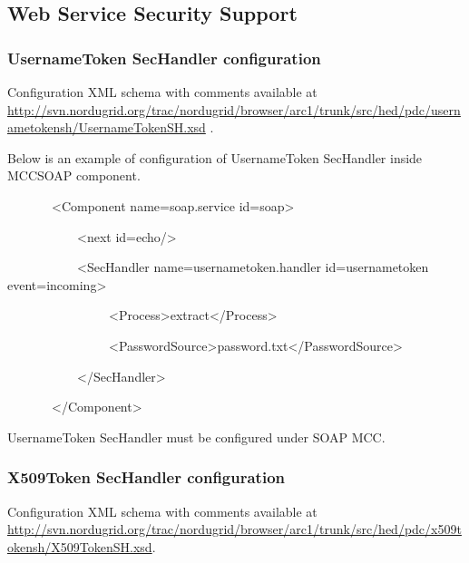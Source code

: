 \documentclass[a4paper]{article}
\newcommand\textstyleInternetlink[1]{\textcolor[rgb]{0.0,0.0,0.5019608}{#1}}
\begin{document}
\subsection[Web Service Security Support]{\color{black} Web Service
Security Support}
\subsubsection[UsernameToken SecHandler configuration]{UsernameToken
SecHandler configuration}
{\upshape\color{black}
Configuration XML schema with comments available at
\url{http://svn.nordugrid.org/trac/nordugrid/browser/arc1/trunk/src/hed/pdc/usernametokensh/UsernameTokenSH.xsd}
.}

{\upshape\color{black}
Below is an example of configuration of UsernameToken SecHandler inside
MCCSOAP component.}

{\ttfamily\color{black}
\ \ \ \ \ \ \ {\textless}Component
name={\textquotedbl}soap.service{\textquotedbl}
id={\textquotedbl}soap{\textquotedbl}{\textgreater}}

{\ttfamily\color{black}
\ \ \ \ \ \ \ \ \ \ \ {\textless}next
id={\textquotedbl}echo{\textquotedbl}/{\textgreater}}

{\ttfamily\color{black}
\ \ \ \ \ \ \ \ \ \ \ {\textless}SecHandler
name={\textquotedbl}usernametoken.handler{\textquotedbl}
id={\textquotedbl}usernametoken{\textquotedbl}
event={\textquotedbl}incoming{\textquotedbl}{\textgreater}}

{\ttfamily\color{black}
\ \ \ \ \ \ \ \ \ \ \ \ \ \ \ \ {\textless}Process{\textgreater}extract{\textless}/Process{\textgreater}}

{\ttfamily\color{black}
\ \ \ \ \ \ \ \ \ \ \ \ \ \ \ \ {\textless}PasswordSource{\textgreater}password.txt{\textless}/PasswordSource{\textgreater}}

{\ttfamily\color{black}
\ \ \ \ \ \ \ \ \ \ \ {\textless}/SecHandler{\textgreater}}

{\ttfamily\color{black}
\ \ \ \ \ \ \ {\textless}/Component{\textgreater}}

{\color{black}
UsernameToken SecHandler must be configured under SOAP MCC.}

\subsubsection[X509Token SecHandler configuration]{X509Token SecHandler
configuration}
{\upshape\color{black}
Configuration XML schema with comments available at
\href{http://svn.nordugrid.org/trac/nordugrid/browser/arc1/trunk/src/hed/pdc/usernametokensh/UsernameTokenSH.xsd}{\textstyleInternetlink{http://svn.nordugrid.org/trac/nordugrid/browser/arc1/trunk/src/hed/pdc/x509tokensh/X509TokenSH.xsd}}.}
\end{document}
